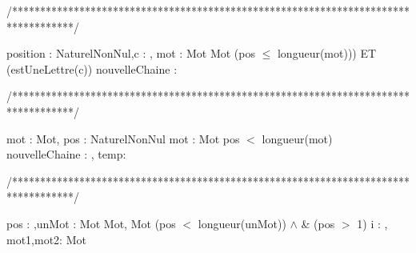 /***********************************************************************************/
\begin{algorithme}%
       {position : NaturelNonNul,c : \caractere, mot : Mot}%
       {Mot}%
       {(pos $\leq$ longueur(mot))) ET (estUneLettre(c))}
       {nouvelleChaine : \chaine}
       {
       }
\end{algorithme}

/***********************************************************************************/
\begin{algorithme}%
      {mot : Mot, pos : NaturelNonNul}%
      {mot : Mot}%
      {pos $<$ longueur(mot)}%
      {nouvelleChaine : \chaine, temp: \caractere }%
      {
      }
\end{algorithme}

/***********************************************************************************/
\begin{algorithme}
         {pos : \entier,unMot : Mot}%
         {Mot, Mot}%
         {(pos $<$ longueur(unMot)) $\land$ \& (pos $>$ 1)}%
         {i : \entier, mot1,mot2: Mot}%
         {
                {
                }
                {
                }
          }
\end{algorithme}
